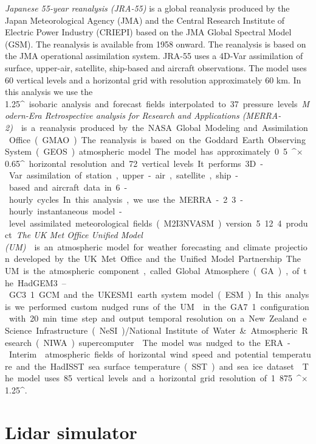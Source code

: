 \textit{Japanese 55-year reanalysis (JRA-55)} \citep{ebita2011,kobayashi2015,harada2016}
is a global reanalysis produced by the
Japan Meteorological Agency (JMA) and the Central Research Institute of Electric
Power Industry (CRIEPI) based on the JMA Global Spectral Model (GSM).
The reanalysis is available from 1958 onward.
The reanalysis is based on the JMA operational assimilation system.
JRA-55 uses a 4D-Var assimilation of surface, upper-air, satellite, ship-based
and aircraft observations. The model uses 60 vertical levels and a horizontal
grid with resolution approximately 60 km. In this analysis we
use the 1.25\unit{^\circ} isobaric analysis and forecast fields interpolated to
37 pressure levels.

\textit{Modern-Era Retrospective analysis for Research and Applications
(MERRA-2)} \citep{gelaro2017}
is a reanalysis produced by the NASA Global Modeling and Assimilation Office (GMAO).
The reanalysis is based on the Goddard Earth Observing System (GEOS) atmospheric
model. The model has approximately 0.5\unit{^\circ}$\times$0.65\unit{^\circ} horizontal
resolution and 72 vertical levels. It performs 3D-Var assimilation of
station, upper-air, satellite, ship-based and aircraft data in 6-hourly
cycles. In this analysis, we use the MERRA-2 3-hourly instantaneous
model-level assimilated meteorological fields (M2I3NVASM) version 5.12.4 product.

\textit{The UK Met Office Unified Model (UM)} \citep{walters2019}
is an atmospheric model for weather forecasting and climate projection
developed by the UK Met Office and the Unified Model Partnership. The UM is the atmospheric
component, called Global Atmosphere (GA), of the HadGEM3–GC3.1 GCM and the UKESM1
earth system model (ESM). In this analysis we performed custom nudged
runs of the UM \citep{telford2008} in the GA7.1 configuration with 20 min.
time step and output temporal resolution
on a New Zealand eScience Infrastructure (NeSI)/National Institute of Water \& Atmospheric Research (NIWA) supercomputer \citep{williams2016}.
The model was nudged to the ERA-Interim \citep{dee2011} atmospheric fields of horizontal wind speed and potential temperature and the HadISST sea surface temperature (SST) and sea ice dataset
\citep{rayner2003}. The model uses 85 vertical levels and a horizontal grid
resolution of 1.875\unit{^\circ}$\times$1.25\unit{^\circ}.

\section{Lidar simulator}
\label{sec:3:lidar-simulator}

